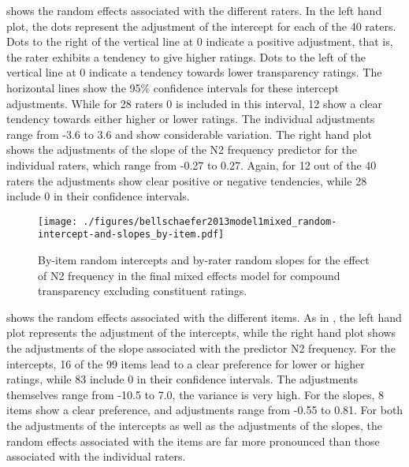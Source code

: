 shows the random effects associated with the different raters. In the
left hand plot, the dots represent the adjustment of the intercept
for each of the 40 raters. Dots to the right of the vertical line at 0
indicate a positive adjustment, that is, the rater exhibits a
tendency to give higher ratings. Dots to the left of the vertical line
at 0 indicate a tendency towards lower transparency ratings. The horizontal lines show the 95\%
confidence intervals for these intercept adjustments. While for 28
raters 0 is included in this interval, 12 show a clear tendency
towards either higher or lower ratings. The individual adjustments
range from -3.6 to 3.6 and show considerable variation. 
The right hand plot shows the adjustments of the slope of the
N2 frequency predictor for the individual raters, which range from
-0.27 to 0.27. Again, for 12 out of the 40 raters the adjustments
show clear positive or negative tendencies, while 28 include 0 in
their confidence intervals. 



\begin{figure}[!htb]
  \centering
  \texttt{[image: ./figures/bellschaefer2013model1mixed\_random-intercept-and-slopes\_by-item.pdf]}
  \caption{By-item random intercepts and by-rater random slopes for the effect of N2 frequency in the final mixed effects model for compound transparency excluding constituent ratings.}
\label{fig:bellschaefer2013_model_1-mixed-effects_random-effects-by-item}
\end{figure}

\pagebreak[4]
shows the random effects associated with the different items. As in
,
the left hand plot represents the adjustment of the intercepts, while
the right hand plot shows the adjustments of the slope associated with
the predictor N2 frequency. For the intercepts, 16 of the 99 items
lead to a clear preference for lower or higher ratings, while 83
include 0 in their confidence intervals. The adjustments themselves
range from -10.5 to 7.0, the variance is very high.  For the slopes, 8
items show a clear preference, and adjustments range from -0.55 to
0.81. For both the adjustments of the intercepts as well as the
adjustments of the slopes, the random effects associated with the
items are far more pronounced than those associated with the
individual raters.

